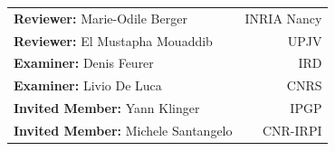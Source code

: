 \begin{titlepage}
\begin{center}
\begin{tabular}{lr}
\textbf{Reviewer:} Marie-Odile Berger & INRIA Nancy\\
\textbf{Reviewer:} El Mustapha Mouaddib & UPJV\\
\textbf{Examiner:} Denis Feurer & IRD\\
\textbf{Examiner:} Livio De Luca & CNRS\\
\textbf{Invited Member:} Yann Klinger & IPGP\\
\textbf{Invited Member:} Michele Santangelo & CNR-IRPI\\
\end{tabular}

\end{center}
\end{titlepage}

\sloppy

\titlepage

\restoregeometry
